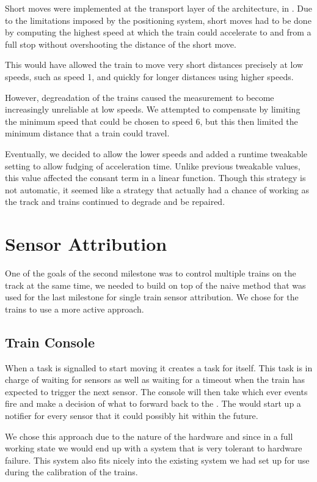\documentclass[pdftex,10pt,a4paper]{article}
\begin{document}
Short moves were implemented at the transport layer of the
architecture, in . Due to the limitations imposed
by the positioning system, short moves had to be done by computing the
highest speed at which the train could accelerate to and from a full
stop without overshooting the distance of the short move.

This would have allowed the train to move very short distances
precisely at low speeds, such as speed 1, and quickly for longer
distances using higher speeds.

However, degreadation of the trains caused the measurement to become
increasingly unreliable at low speeds. We attempted to compensate by
limiting the minimum speed that could be chosen to speed 6, but this
then limited the minimum distance that a train could
travel.

Eventually, we decided to allow the lower speeds and added a
runtime tweakable setting to allow fudging of acceleration
time. Unlike previous tweakable values, this value affected the
consant term in a linear function. Though this strategy is not
automatic, it seemed like a strategy that actually had a chance of
working as the track and trains continued to degrade and be repaired.

\section*{Sensor Attribution}

One of the goals of the second milestone was to control multiple
trains on the track at the same time, we needed to build on top of the
naive method that was used for the last milestone for single train
sensor attribution. We chose for the trains to use a more active
approach.

\subsection*{Train Console}

When a  task is signalled to start moving it creates a
 task for itself. This task is in charge of waiting for
sensors as well as waiting for a timeout when the train has expected to trigger
the next sensor. The console will then take which ever events fire and make a
decision of what to forward back to the . The
 would start up a notifier for every sensor that it could
possibly hit within the future.

We chose this approach due to the nature of the hardware and since in a full
working state we would end up with a system that is very tolerant to hardware
failure. This system also fits nicely into the existing system we had set up
for use during the calibration of the trains.
\end{document}
